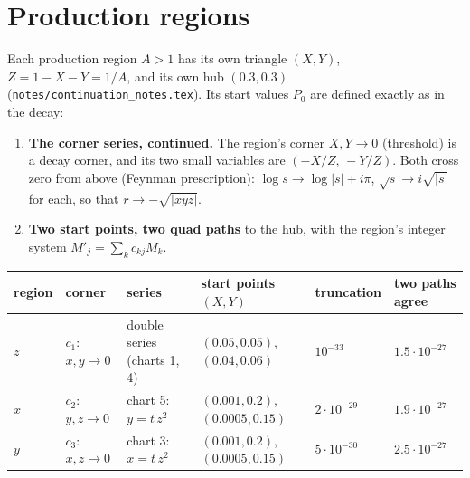 \documentclass[11pt]{article}
\begin{document}
\section*{Production regions}
Each production region $A>1$ has its own triangle $(X,Y)$, $Z=1-X-Y=1/A$, and its own hub $(0.3,0.3)$
(\texttt{notes/continuation\_notes.tex}). Its start values $P_0$ are defined exactly as in the decay:
\begin{enumerate}
\item \textbf{The corner series, continued.} The region's corner $X,Y\to0$ (threshold) is a decay corner, and its two
  small variables are $(-X/Z,\,-Y/Z)$. Both cross zero from above (Feynman prescription): $\log s\to\log|s|+i\pi$,
  $\sqrt s\to i\sqrt{|s|}$ for each, so that $r\to-\sqrt{|xyz|}$.
\item \textbf{Two start points, two quad paths} to the hub, with the region's integer system $M'_j=\sum_k c_{kj}M_k$.
\end{enumerate}
\begin{center}\small
\begin{tabular}{llllll}
region & corner & series & start points $(X,Y)$ & truncation & two paths agree \\ \hline
$z$ & $c_1$: $x,y\to0$ & double series (charts 1, 4) & $(0.05,0.05)$, $(0.04,0.06)$ & $10^{-33}$ & $1.5\cdot10^{-27}$ \\
$x$ & $c_2$: $y,z\to0$ & chart 5: $y=t\,z^2$ & $(0.001,0.2)$, $(0.0005,0.15)$ & $2\cdot10^{-29}$ & $1.9\cdot10^{-27}$ \\
$y$ & $c_3$: $x,z\to0$ & chart 3: $x=t\,z^2$ & $(0.001,0.2)$, $(0.0005,0.15)$ & $5\cdot10^{-30}$ & $2.5\cdot10^{-27}$
\end{tabular}
\end{center}
\end{document}
